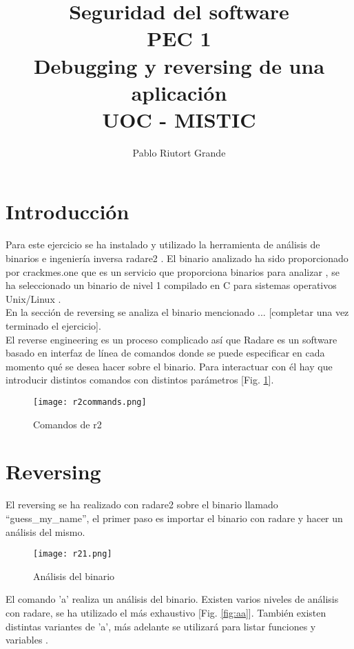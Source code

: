 \documentclass[10pt,a4paper]{article}
\author{Pablo Riutort Grande}
\title{
	Seguridad del software\\
	\vspace{0.5cm}
	PEC 1\\
	\vspace{1cm}
	\textbf{Debugging y reversing de una aplicación}
	\vspace{1cm}\\UOC - MISTIC
}
\begin{document}
\maketitle

\pagebreak
\tableofcontents
\listoffigures

\pagebreak

\section{Introducción}
Para este ejercicio se ha instalado y utilizado la herramienta de análisis de binarios e ingeniería inversa radare2 \cite{radare}. El binario analizado ha sido proporcionado por crackmes.one que es un servicio que proporciona binarios para analizar \cite{crackmes}, se ha seleccionado un binario de nivel 1 compilado en C para sistemas operativos Unix/Linux \cite{guess}.\\
En la sección de reversing se analiza el binario mencionado ... [completar una vez terminado el ejercicio].\\

El reverse engineering es un proceso complicado así que Radare es un software basado en interfaz de línea de comandos donde se puede especificar en cada momento qué se desea hacer sobre el binario. Para interactuar con él hay que introducir distintos comandos con distintos parámetros [Fig. \ref{fig:r2commands}].\\

\begin{figure}[h!]
  \centering
  \texttt{[image: r2commands.png]}\\
  \caption{Comandos de r2}
  \label{fig:r2commands}
\end{figure}

\pagebreak

\section{Reversing}
El reversing se ha realizado con radare2 sobre el binario llamado ``guess\_my\_name'', el primer paso es importar el binario con radare y hacer un análisis del mismo.\\
\begin{figure}[h!]
  \centering
  \texttt{[image: r21.png]}\\
  \caption{Análisis del binario}
  \label{fig:r21}
\end{figure}

El comando 'a' realiza un análisis del binario. Existen varios niveles de análisis con radare, se ha utilizado el más exhaustivo [Fig. \ref{fig:aa}]. También existen distintas variantes de 'a', más adelante se utilizará para listar funciones y variables \cite{radare}.
\end{document}
